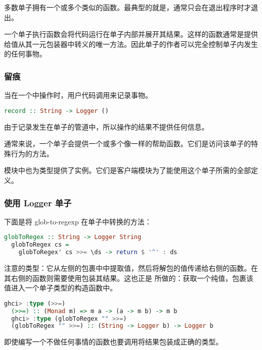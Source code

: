 \documentclass[./main.tex]{subfiles}
\begin{document}
多数单子拥有一个或多个类似的函数。最典型的就是，通常只会在退出程序时才退出。

一个单子执行函数会将代码运行在单子内部并展开其结果。这样的函数通常是提供给值从其一元包装器中转义的唯一方法。因此单子的作者可以完全控制单子内发生的任何事物。

\subsubsection*{留痕}

当在一个中操作时，用户代码调用来记录事物。

\begin{lstlisting}[language=Haskell]
  record :: String -> Logger ()
\end{lstlisting}

由于记录发生在单子的管道中，所以操作的结果不提供任何信息。

通常来说，一个单子会提供一个或多个像一样的帮助函数。它们是访问该单子的特殊行为的方法。

模块中也为类型提供了实例。它们是客户端模块为了能使用这个单子所需的全部定义。

\subsubsection*{使用 Logger 单子}

下面是将 glob-to-regexp 在单子中转换的方法：

\begin{lstlisting}[language=Haskell]
  globToRegex :: String -> Logger String
  globToRegex cs =
    globToRegex' cs >>= \ds -> return $ '^' : ds
\end{lstlisting}

注意\acode{(>>=)}的类型：它从左侧的包裹中中提取值，然后将解包的值传递给右侧的函数。在其右侧的函数则需要使用包装其结果。这也正是
所做的：获取一个纯值，包裹该值进入一个单子类型的构造函数中。

\begin{lstlisting}[language=Haskell]
  ghci> :type (>>=)
  (>>=) :: (Monad m) => m a -> (a -> m b) -> m b
  ghci> :type (globToRegex "" >>=)
  (globToRegex "" >>=) :: (String -> Logger b) -> Logger b
\end{lstlisting}

即使编写一个不做任何事情的函数也要调用将结果包装成正确的类型。
\end{document}
